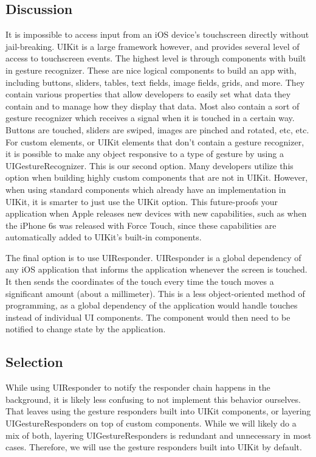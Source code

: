 \documentclass[letterpaper,10pt,titlepage]{article}
\begin{document}
\subsection{Discussion}
It is impossible to access input from an iOS device's touchscreen directly without jail-breaking. UIKit is a large framework however, and provides several level of access to touchscreen events. The highest level is through components with built in gesture recognizer. These are nice logical components to build an app with, including buttons, sliders, tables, text fields, image fields, grids, and more. They contain various properties that allow developers to easily set what data they contain and to manage how they display that data. Most also contain a sort of gesture recognizer which receives a signal when it is touched in a certain way. Buttons are touched, sliders are swiped, images are pinched and rotated, etc, etc.\\

For custom elements, or UIKit elements that don't contain a gesture recognizer, it is possible to make any object responsive to a type of gesture by using a UIGestureRecognizer. This is our second option. Many developers utilize this option when building highly custom components that are not in UIKit. However, when using standard components which already have an implementation in UIKit, it is smarter to just use the UIKit option. This future-proofs your application when Apple releases new devices with new capabilities, such as when the iPhone 6s was released with Force Touch, since these capabilities are automatically added to UIKit's built-in components.

The final option is to use UIResponder. UIResponder is a global dependency of any iOS application that informs the application whenever the screen is touched. It then sends the coordinates of the touch every time the touch moves a significant amount (about a millimeter). This is a less object-oriented method of programming, as a global dependency of the application would handle touches instead of individual UI components. The component would then need to be notified to change state by the application.

\subsection{Selection}
While using UIResponder to notify the responder chain happens in the background, it is likely less confusing to not implement this behavior ourselves. That leaves using the gesture responders built into UIKit components, or layering UIGestureResponders on top of custom components. While we will likely do a mix of both, layering UIGestureResponders is redundant and unnecessary in most cases. Therefore, we will use the gesture responders built into UIKit by default.
\end{document}
